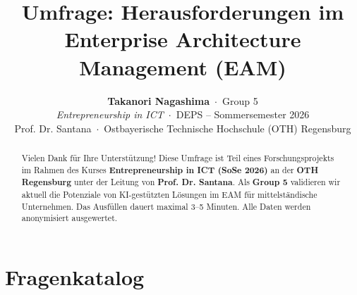 \documentclass[11pt,a4paper]{article}
\title{\textbf{Umfrage: Herausforderungen im Enterprise Architecture Management (EAM)}}
\author{%
  \textbf{Takanori Nagashima} \,$\cdot$\, Group 5 \\[0.05cm]
  \textit{Entrepreneurship in ICT} \,$\cdot$\, DEPS -- Sommersemester 2026 \\
  Prof. Dr. Santana \,$\cdot$\, Ostbayerische Technische Hochschule (OTH) Regensburg
}
\date{\vspace{-0.5cm}}
\begin{document}
\maketitle
\thispagestyle{empty}

\begin{abstract}
\noindent Vielen Dank für Ihre Unterstützung! Diese Umfrage ist Teil eines Forschungsprojekts im Rahmen des Kurses \textbf{Entrepreneurship in ICT (SoSe 2026)} an der \textbf{OTH Regensburg} unter der Leitung von \textbf{Prof. Dr. Santana}. Als \textbf{Group 5} validieren wir aktuell die Potenziale von KI-gestützten Lösungen im EAM für mittelständische Unternehmen. Das Ausfüllen dauert maximal 3--5 Minuten. Alle Daten werden anonymisiert ausgewertet.
\end{abstract}

\vspace{-0.2cm}
\section*{Fragenkatalog}
\vspace{-0.1cm}
\end{document}
